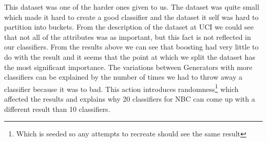 This dataset was one of the harder ones given to us. The dataset was quite small
which made it hard to create a good classifier and the dataset it self was hard
to partition into buckets. From the description of the dataset at UCI we could
see that not all of the attributes was as important, but this fact is not
reflected in our classifiers. From the results above we can see that boosting
had very little to do with the result and it seems that the point at which we
split the dataset has the most significant importance. The variations between
Generators with more classifiers can be explained by the number of times we had
to throw away a classifier because it was to bad. This action introduces
randomness\footnote{Which is seeded so any attempts to recreate should see the
same result} which affected the results and explains why 20 classifiers for 
NBC can come up with a different result than 10 classifiers.
